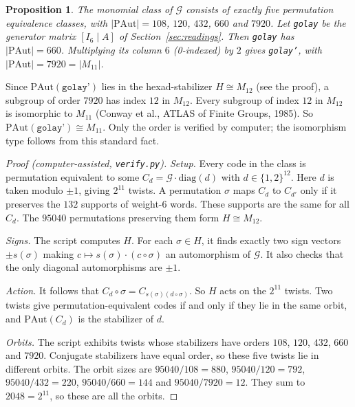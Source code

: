 \documentclass[11pt]{article}
\newtheorem{proposition}[theorem]{Proposition}
\theoremstyle{remark}
\begin{document}
\begin{proposition}\label{prop:golay}
The monomial class of $\mathcal G$ consists of exactly five permutation
equivalence classes, with $|\mathrm{PAut}|=108$, $120$, $432$, $660$ and $7920$.
Let \texttt{golay} be the generator matrix $[I_6\mid A]$ of Section~\ref{sec:readings}. Then
\texttt{golay} has $|\mathrm{PAut}|=660$. Multiplying its column $6$
(0-indexed) by $2$ gives \texttt{golay'}, with $|\mathrm{PAut}|=7920=|M_{11}|$.
\end{proposition}
Since $\mathrm{PAut}(\texttt{golay'})$ lies in the hexad-stabilizer $H\cong M_{12}$
(see the proof), a subgroup of order $7920$ has index $12$ in $M_{12}$. Every
subgroup of index $12$ in $M_{12}$ is isomorphic to $M_{11}$ (Conway et al., ATLAS
of Finite Groups, 1985). So $\mathrm{PAut}(\texttt{golay'})\cong M_{11}$. Only the
order is verified by computer; the isomorphism type follows from this standard fact.
\begin{proof}[Proof (computer-assisted, \texttt{verify.py})]
\emph{Setup.} Every code in the class is permutation equivalent to some
$C_d=\mathcal G\cdot\mathrm{diag}(d)$ with $d\in\{1,2\}^{12}$. Here $d$ is taken
modulo $\pm1$, giving $2^{11}$ twists. A permutation $\sigma$ maps $C_d$ to
$C_{d'}$ only if it preserves the $132$ supports of weight-$6$ words. These
supports are the same for all $C_d$. The $95040$ permutations preserving them
form $H\cong M_{12}$.

\emph{Signs.} The script computes $H$. For each $\sigma\in H$, it finds exactly
two sign vectors $\pm s(\sigma)$ making $c\mapsto s(\sigma)\cdot(c\circ\sigma)$ an
automorphism of $\mathcal G$. It also checks that the only diagonal automorphisms
are $\pm1$.

\emph{Action.} It follows that $C_d\circ\sigma=C_{s(\sigma)(d\circ\sigma)}$.
So $H$ acts on the $2^{11}$ twists. Two twists give permutation-equivalent
codes if and only if they lie in the same orbit, and
$\mathrm{PAut}(C_d)$ is the stabilizer of $d$.

\emph{Orbits.} The script exhibits twists whose stabilizers have orders $108$,
$120$, $432$, $660$ and $7920$. Conjugate stabilizers have equal order, so these
five twists lie in different orbits. The orbit sizes are
$95040/108=880$, $95040/120=792$, $95040/432=220$, $95040/660=144$ and
$95040/7920=12$. They sum to $2048=2^{11}$, so these are all the orbits.
\end{proof}
\end{document}
